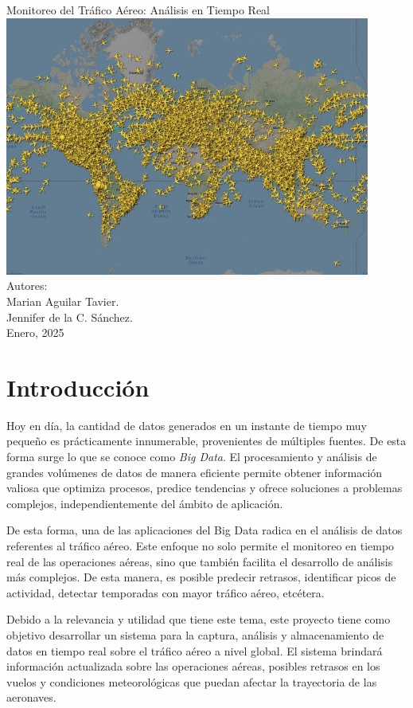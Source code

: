 \documentclass{article}
\begin{document}
\begin{titlepage}
    \centering
    \vfill
    \Huge Monitoreo del Tráfico Aéreo: Análisis en Tiempo Real\\[1cm]
    \includegraphics[width=0.9\textwidth]{presentation.jpg}  
    \vfill
    \Large Autores: \\Marian Aguilar Tavier. \\  Jennifer de la C. Sánchez. \\[1cm]
    \Large Enero, 2025
    \vfill
\end{titlepage}

\section{Introducción}
Hoy en día, la cantidad de datos generados en un instante de tiempo muy pequeño es prácticamente innumerable, provenientes de múltiples fuentes. De esta forma surge lo que se conoce como \textit{Big Data}.
El procesamiento y análisis de grandes volúmenes de datos de manera eficiente permite obtener información valiosa que optimiza procesos, predice tendencias y ofrece soluciones a problemas complejos, independientemente del ámbito de aplicación.

De esta forma, una de las aplicaciones del Big Data radica en el análisis de datos referentes al tráfico aéreo. Este enfoque no solo permite el monitoreo en tiempo real de las operaciones aéreas, sino que también facilita el desarrollo de análisis más complejos. De esta manera, es posible predecir retrasos, identificar picos de actividad, detectar temporadas con mayor tráfico aéreo, etcétera.

Debido a la relevancia y utilidad que tiene este tema, este proyecto tiene como objetivo desarrollar un sistema para la captura, análisis y almacenamiento de datos en tiempo real sobre el tráfico aéreo a nivel global. El sistema brindará información actualizada sobre las operaciones aéreas, posibles retrasos en los vuelos y condiciones meteorológicas que puedan afectar la trayectoria de las aeronaves.  
\end{document}
